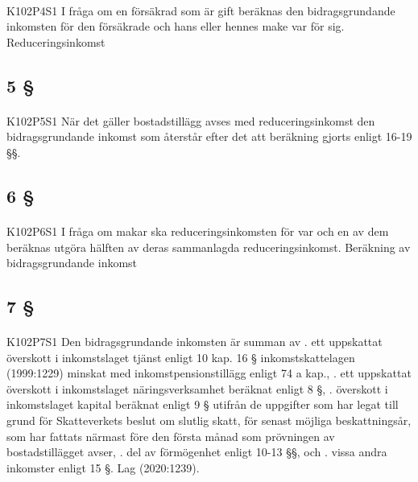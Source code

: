 \documentclass[a4paper,notitlepage,openany,10pt]{book}
\begin{document}
\paragraph*{}
{\tiny K102P4S1}
I fråga om en försäkrad som är gift beräknas den bidragsgrundande inkomsten för den försäkrade och hans eller hennes make var för sig.
Reduceringsinkomst
\subsection*{5 §}
\paragraph*{}
{\tiny K102P5S1}
När det gäller bostadstillägg avses med reduceringsinkomst den bidragsgrundande inkomst som återstår efter det att beräkning gjorts enligt 16-19 §§.
\subsection*{6 §}
\paragraph*{}
{\tiny K102P6S1}
I fråga om makar ska reduceringsinkomsten för var och en av dem beräknas utgöra hälften av deras sammanlagda reduceringsinkomst.
Beräkning av bidragsgrundande inkomst
\subsection*{7 §}
\paragraph*{}
{\tiny K102P7S1}
Den bidragsgrundande inkomsten är summan av
. ett uppskattat överskott i inkomstslaget tjänst enligt 10 kap. 16 § inkomstskattelagen (1999:1229) minskat med inkomstpensionstillägg enligt 74 a kap.,
. ett uppskattat överskott i inkomstslaget näringsverksamhet beräknat enligt 8 §,
. överskott i inkomstslaget kapital beräknat enligt 9 § utifrån de uppgifter som har legat till grund för Skatteverkets beslut om slutlig skatt, för senast möjliga beskattningsår, som har fattats närmast före den första månad som prövningen av bostadstillägget avser,
. del av förmögenhet enligt 10-13 §§, och
. vissa andra inkomster enligt 15 §.
Lag (2020:1239).
\end{document}
